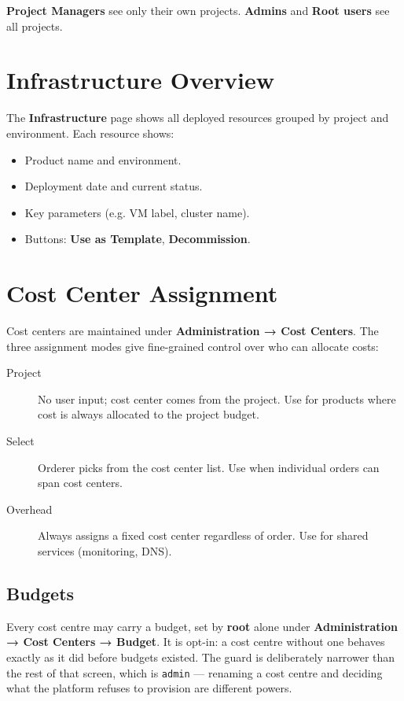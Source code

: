 \documentclass[12pt,a4paper,twoside]{report}
\newcommand{\code}[1]{\texttt{#1}}
\newcommand{\role}[1]{\textsf{\textbf{#1}}}
\begin{document}
\role{Project Managers} see only their own projects.
\role{Admins} and \role{Root users} see all projects.

\section{Infrastructure Overview}
\label{sec:infra-overview}

The \textbf{Infrastructure} page shows all deployed resources grouped by
project and environment. Each resource shows:
\begin{itemize}
  \item Product name and environment.
  \item Deployment date and current status.
  \item Key parameters (e.g. VM label, cluster name).
  \item Buttons: \textbf{Use as Template}, \textbf{Decommission}.
\end{itemize}

\section{Cost Center Assignment}

Cost centers are maintained under \textbf{Administration → Cost Centers}.
The three assignment modes give fine-grained control over who can
allocate costs:

\begin{description}
  \item[Project] No user input; cost center comes from the project.
        Use for products where cost is always allocated to the project
        budget.
  \item[Select] Orderer picks from the cost center list. Use when
        individual orders can span cost centers.
  \item[Overhead] Always assigns a fixed cost center regardless of
        order. Use for shared services (monitoring, DNS).
\end{description}

\subsection{Budgets}
\label{sec:cost-centre-budgets}

Every cost centre may carry a budget, set by \textbf{root} alone under
\textbf{Administration → Cost Centers → Budget}. It is opt-in: a cost
centre without one behaves exactly as it did before budgets existed. The
guard is deliberately narrower than the rest of that screen, which is
\code{admin} --- renaming a cost centre and deciding what the platform
refuses to provision are different powers.
\end{document}
